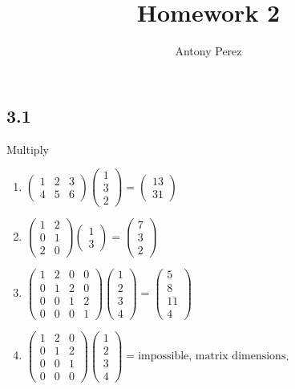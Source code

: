 \documentclass{amsart}
\title{Homework 2}
\author{Antony Perez}
\begin{document}
\maketitle
\subsection*{3.1} Multiply 
\begin{enumerate}[label=\alph*)]
\item $\begin{pmatrix} 1 & 2 & 3 \\ 4 & 5 & 6 \end{pmatrix} \begin{pmatrix} 1 \\ 3 \\ 2 \end{pmatrix} = \begin{pmatrix} 13 \\ 31 \end{pmatrix}$
\item $\begin{pmatrix} 1 & 2 \\ 0 & 1 \\ 2 & 0 \end{pmatrix} \begin{pmatrix} 1 \\ 3 \end{pmatrix} = \begin{pmatrix} 7 \\ 3 \\ 2 \end{pmatrix}$
\item $\begin{pmatrix} 1 & 2 & 0 & 0 \\ 0 & 1 & 2 & 0 \\ 0 & 0 & 1 & 2 \\ 0 & 0 & 0 & 1 \end{pmatrix} \begin{pmatrix} 1 \\ 2 \\ 3 \\ 4 \end{pmatrix} = \begin{pmatrix} 5 \\ 8 \\ 11 \\ 4 \end{pmatrix}$
\item $\begin{pmatrix} 1 & 2 & 0 \\ 0 & 1 & 2 \\ 0 & 0 & 1 \\ 0 & 0 & 0 \end{pmatrix} \begin{pmatrix} 1 \\ 2 \\ 3 \\ 4 \end{pmatrix} = \text{impossible, matrix dimensions}$.
\end{enumerate}
\end{document}
